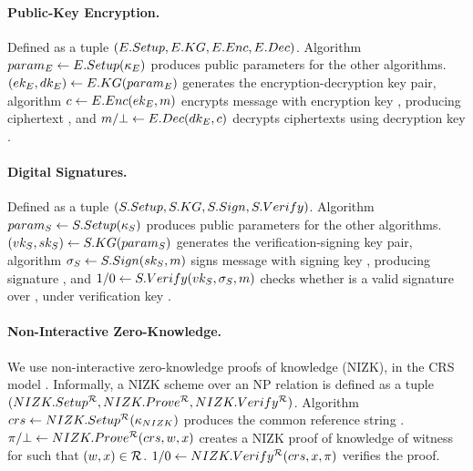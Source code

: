 \paragraph{Public-Key Encryption.} %
Defined as a tuple $(E.Setup,E.KG,E.Enc,E.Dec)$. Algorithm $param_{E} \gets
E.Setup(\kappa_{E})$ produces public parameters for the other algorithms.
$(ek_{E},dk_{E}) \gets E.KG(param_{E})$ generates the encryption-decryption key
pair, algorithm $c \gets E.Enc(ek_{E},m)$ encrypts message \msg with
encryption key \Eek, producing ciphertext \Ec, and $m/\bot \gets E.Dec(dk_{E},
c)$ decrypts ciphertexts using decryption key \Edk. 

\paragraph{Digital Signatures.} %
Defined as a tuple $(S.Setup,S.KG,S.Sign,S.Verify)$. Algorithm $param_{S} \gets
S.Setup(\kappa_{S})$ produces public parameters for the other algorithms.
$(vk_{S},sk_{S}) \gets S.KG(param_{S})$ generates the verification-signing key
pair, algorithm $\sigma_{S} \gets S.Sign(sk_{S},m)$ signs message \msg with
signing key \Ssk, producing signature \Ssig, and $1/0 \gets S.Verify(vk_{S},
\sigma_{S},m)$ checks whether \Ssig is a valid signature over \msg, under
verification key \Svk. 

\paragraph{Non-Interactive Zero-Knowledge.} %
We use non-interactive zero-knowledge proofs of knowledge (NIZK), in the CRS
model \needcite. Informally, a NIZK scheme over an NP relation \NIZKRel is
defined as a tuple $(NIZK.Setup^\mathcal{R},NIZK.Prove^\mathcal{R},
NIZK.Verify^\mathcal{R})$. Algorithm $crs \gets NIZK.Setup^\mathcal{R}
(\kappa_{NIZK})$ produces the common reference string \NIZKcrs. $\pi/\bot
\gets NIZK.Prove^\mathcal{R}(crs,w,x)$ creates a NIZK proof of
knowledge of witness \NIZKw for \NIZKx such that $(w,x) \in \mathcal{R}$.
$1/0 \gets NIZK.Verify^\mathcal{R}(crs,x,\pi)$ verifies the proof.

